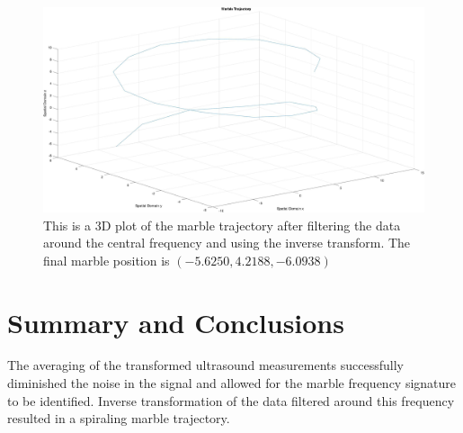 \documentclass{article}
\begin{document}
\begin{figure}
    \centering
    \includegraphics[width=1.0\linewidth]{marbleTrajectory.jpg}
    \caption{This is a 3D plot of the marble trajectory after filtering the data around the central frequency and using the inverse transform. The final marble position is $(-5.6250,4.2188,-6.0938)$ }
    \label{fig:marbleTrajectory}
\end{figure}

\section{Summary and Conclusions}
The averaging of the transformed ultrasound measurements successfully diminished the noise in the signal and allowed for the marble frequency signature to be identified. Inverse transformation of the data filtered around this frequency resulted in a spiraling marble trajectory.
\end{document}
